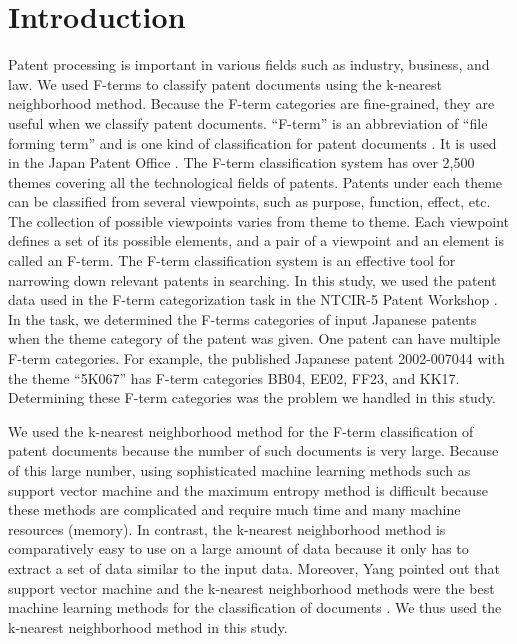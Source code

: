 \documentclass[english]{jnlp_1.2c}
\begin{document}
\maketitle


\section{Introduction}
\label{sec:c}

Patent processing is important in 
various fields such as industry, business, and law.
We used F-terms \cite{Schellner2002_2} to classify 
patent documents using the k-nearest neighborhood method.
Because the F-term categories are fine-grained, 
they are useful when we classify patent documents. 
``F-term'' is an abbreviation of ``file forming term'' 
and is one kind of classification for patent documents \cite{Ntcir5_patent_2}.
It is used in the Japan Patent Office \cite{JPO_2_2}.
The F-term classification system has
over 2,500 themes covering all the technological
fields of patents. Patents under each theme can be
classified from several viewpoints, such as purpose,
function, effect, etc. The collection of possible
viewpoints varies from theme to theme. Each
viewpoint defines a set of its possible elements, and a
pair of a viewpoint and an element is called an F-term.
The F-term classification system is an effective
tool for narrowing down relevant patents in searching.
In this study, we used the patent data 
used in the F-term categorization task
in the NTCIR-5 Patent Workshop \cite{Ntcir5_patent_web_2,Ntcir5_patent_2}. 
In the task, we determined the F-terms categories of input Japanese patents 
when the theme category of the patent was given. 
One patent can have
multiple F-term categories. 
For example, the published Japanese patent 2002-007044
with the theme ``5K067'' has 
F-term categories BB04, EE02, FF23, and KK17.
Determining these F-term categories was the problem we handled in this study.

We used the k-nearest neighborhood method for
the F-term classification of patent documents because
the number of such documents is very large. 
Because of this large number, using sophisticated machine learning methods
such as support vector machine \cite{SVM} and the maximum entropy method \cite{ristad97} is difficult
because these methods are complicated and 
require much time and many machine resources (memory). 
In contrast, 
the k-nearest neighborhood method is comparatively 
easy to use on a large amount of data 
because it only has to extract 
a set of data similar to the input data. 
Moreover, Yang pointed out that 
support vector machine and the k-nearest neighborhood methods 
were the best machine learning methods for the classification 
of documents \cite{Yang-sigir99_2}. 
We thus used the k-nearest neighborhood method in this study.
\end{document}
